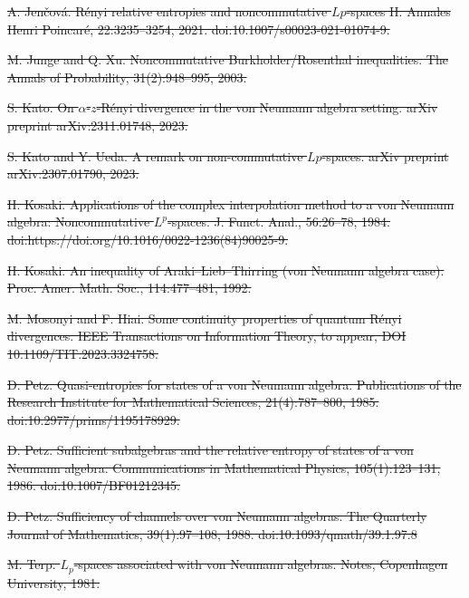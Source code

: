 \documentclass[12pt]{article}
\theoremstyle{definition}
\theoremstyle{remark}
\providecommand{\DIFdeltex}[1]{{\protect\color{red}\sout{#1}}}                      %
\providecommand{\DIFaddbegin}{} %
\providecommand{\DIFaddend}{} %
\providecommand{\DIFdelend}{} %
\providecommand{\DIFdel}[1]{\texorpdfstring{\DIFdeltex{#1}}{}} %
\begin{document}
\DIFdel{A. Jen\v cov\'a. R\'enyi relative entropies and noncommutative $Lp$-spaces II. Annales Henri
Poincar\'e, 22:3235--3254, 2021. doi:10.1007/s00023-021-01074-9.
}%

\DIFdel{M. Junge and Q. Xu. Noncommutative Burkholder/Rosenthal inequalities. The Annals of
Probability, 31(2):948--995, 2003.
}%

\DIFdel{S. Kato. On $\alpha$-$z$-R\'enyi divergence in the von Neumann algebra setting. arXiv preprint
arXiv:2311.01748, 2023.
}%

\DIFdel{S. Kato and Y. Ueda. A remark on non-commutative $Lp$-spaces. arXiv preprint
arXiv:2307.01790,
2023.
}%

\DIFdel{H. Kosaki. Applications of the complex interpolation method to a von Neumann algebra: Noncommutative
$L^p$-spaces.
J. Funct. Anal., 56:26--78, 1984. doi:https://doi.org/10.1016/0022-1236(84)90025-9.
}%

\DIFdel{H. Kosaki. An inequality of Araki--Lieb--Thirring (von Neumann algebra case).
Proc. Amer. Math. Soc., 114:477--481, 1992.
}%

\DIFdel{M. Mosonyi and F. Hiai. Some continuity properties of quantum R\'enyi divergences.
IEEE Transactions on Information Theory, to appear, DOI 10.1109/TIT.2023.3324758.
}%

\DIFdel{D. Petz. Quasi-entropies for states of a von Neumann algebra. Publications of the Research
Institute for Mathematical Sciences, 21(4):787--800, 1985. doi:10.2977/prims/1195178929.
}%

\DIFdel{D. Petz. Sufficient subalgebras and the relative entropy of states of a von Neumann algebra.
Communications in Mathematical Physics, 105(1):123--131, 1986. doi:10.1007/BF01212345.
}%

\DIFdel{D. Petz. Sufficiency of channels over von Neumann algebras. The Quarterly Journal of
Mathematics, 39(1):97–108, 1988. doi:10.1093/qmath/39.1.97.8
}%

\DIFdel{M. Terp. $L_p$-spaces associated with von Neumann algebras. Notes, Copenhagen University,
1981.
}%
\DIFdelend \DIFaddbegin 

\DIFaddend 
\end{document}
